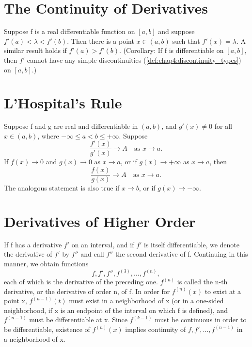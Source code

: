 \section{The Continuity of Derivatives}
\label{sec:chap5:continuity_derivatives}

\begin{theorem} %
  \label{thm:chap5:darboux_ivt_derivative}
  Suppose f is a real differentiable function on $[a, b]$ and suppose
  $f'(a) < \lambda < f'(b)$. Then there is a point $x \in (a, b)$
  such that $f'(x) = \lambda$.
  A similar result holds if $f'(a) > f'(b)$.
  (Corollary: If f is differentiable on $[a, b]$, then $f'$ cannot
    have any simple discontinuities
  (\autoref{def:chap4:discontinuity_types}) on $[a, b]$.)
\end{theorem}

\section{L'Hospital's Rule}
\label{sec:chap5:lhospitals_rule}

\begin{theorem} %
  \label{thm:chap5:lhospitals_rule}
  Suppose f and g are real and differentiable in $(a, b)$, and $g'(x)
  \ne 0$ for all $x \in (a, b)$, where $-\infty \le a < b \le +\infty$. Suppose
  \[ \frac{f'(x)}{g'(x)} \to A \quad \text{as } x \to a. \]
  If $f(x) \to 0$ and $g(x) \to 0$ as $x \to a$, or if $g(x) \to
  +\infty$ as $x \to a$, then
  \[ \frac{f(x)}{g(x)} \to A \quad \text{as } x \to a. \]
  The analogous statement is also true if $x \to b$, or if $g(x) \to -\infty$.
\end{theorem}

\section{Derivatives of Higher Order}
\label{sec:chap5:higher_derivatives}

\begin{definition} %
  \label{def:chap5:higher_deriv_notation}
  If f has a derivative $f'$ on an interval, and if $f'$ is itself
  differentiable, we denote the derivative of $f'$ by $f''$ and call
  $f''$ the second derivative of f. Continuing in this manner, we
  obtain functions
  \[ f, f', f'', f^{(3)}, \dots, f^{(n)}, \]
  each of which is the derivative of the preceding one. $f^{(n)}$ is
  called the n-th derivative, or the derivative of order n, of f.
  In order for $f^{(n)}(x)$ to exist at a point x, $f^{(n-1)}(t)$
  must exist in a neighborhood of x (or in a one-sided neighborhood,
  if x is an endpoint of the interval on which f is defined), and
  $f^{(n-1)}$ must be differentiable at x. Since $f^{(k-1)}$ must be
  continuous in order to be differentiable, existence of $f^{(n)}(x)$
  implies continuity of $f, f', \dots, f^{(n-1)}$ in a neighborhood of x.
\end{definition}


